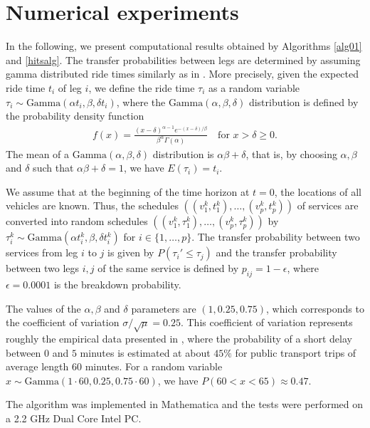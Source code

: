 \documentclass[dissertation,draft*]{aaltoseries}
\begin{document}
\section{Numerical experiments}
\label{experiments}
In the following, we present computational results obtained by Algorithms \ref{alg01} and \ref{hitsalg}. 
The transfer probabilities between legs are determined by assuming 
gamma distributed ride times similarly as in 
\cite{russell, chiang}. 
More precisely, given the expected ride time $t_i$ of leg $i$, we define the 
ride time $\tau_{i}$ as a random variable $\tau_{i} \sim \text{Gamma}( \alpha t_{i}, \beta , \delta t_{i} )$,
where the $\text{Gamma}( \alpha, \beta , \delta )$ distribution is defined by the 
probability density function 
\begin{align}
\label{gammakaava}
f(x)=\frac{(x-\delta)^{\alpha-1} e^{-(x-\delta)/\beta}}{\beta^{\alpha} \Gamma (\alpha)} \ \ \ \mbox{ for } x > \delta \geq 0.
\end{align}
The mean of a $\text{Gamma} (\alpha, \beta, \delta)$ distribution is $\alpha \beta + \delta$,
that is, by choosing $\alpha, \beta$ and $\delta$ such that $\alpha \beta + \delta= 1$,
we have $E(\tau_{i})=t_{i}$. 

We assume that at the beginning of the time horizon at $t=0$, the locations of all vehicles 
are known. Thus, %
the schedules
$((v_1^k,t_1^k),\ldots,(v_p^k,t_p^k))$ of services are converted into random schedules $((v_1^k,\tau_1^k),\ldots,(v_p^k,\tau_p^k))$
by $\tau_i^k \sim \textrm{Gamma} (\alpha t_{i}^k, \beta , \delta t_{i}^k)$ for $i \in \{1,\ldots,p\}$.
The transfer probability between two services from leg $i$ to $j$ is given by $P(\tau_i' \leq \tau_j)$
and the transfer probability between two legs $i,j$ of the same service is defined by $p_{ij}=1-\epsilon$,
where $\epsilon = 0.0001$ is the breakdown probability.

The values of the $\alpha, \beta$ and $\delta$
parameters are $(1, 0.25, 0.75)$, which corresponds to the coefficient of variation 
$\sigma/\sqrt{\mu} = 0.25$. This coefficient of variation represents roughly the empirical data presented in 
\cite{rietveld}, where the probability of a short delay between $0$ and $5$ minutes is estimated at about $45\%$ for public transport trips
of average length $60$ minutes. For a random variable $x \sim \text{Gamma}( 1 \cdot 60, 0.25 , 0.75 \cdot 60)$, we have
$P(60 < x < 65) \approx 0.47$.


The algorithm was implemented in Mathematica and the tests were performed on a 2.2
GHz Dual Core Intel PC. 
\end{document}
